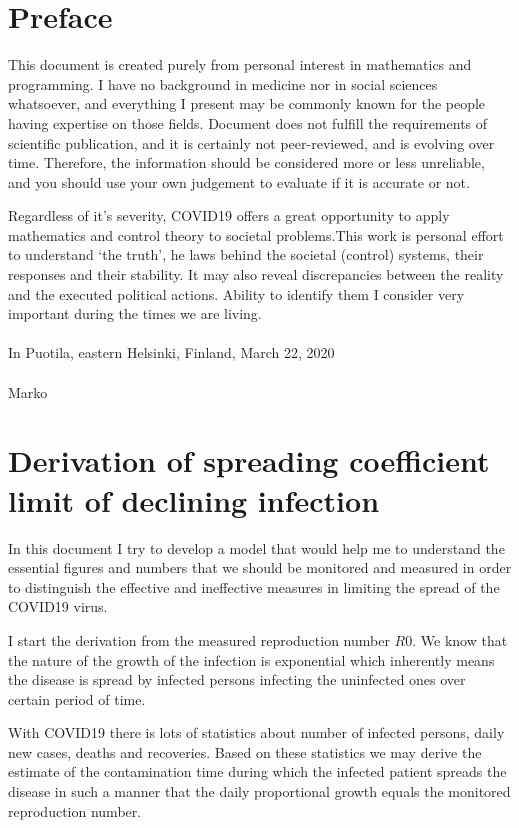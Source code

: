 \chapter{Preface}
This document is created purely from personal interest in mathematics and
programming. I have no background in medicine nor in social sciences
whatsoever, and everything I present may be commonly known for the people
having expertise on those fields. Document does not fulfill the requirements
of scientific publication, and it is certainly not peer-reviewed, and is
evolving over time. Therefore, the information should be considered more or
less unreliable, and you should use your own judgement to evaluate if it is
accurate or not. 

Regardless of it's
severity, COVID19 offers a great opportunity to apply mathematics and control
theory to societal problems.This work is personal effort to understand `the
truth', he laws behind the societal (control) systems, their responses and
their stability.  It may also reveal discrepancies between the reality and the
executed political actions. Ability to identify them I consider very important
during the times we are living.
\\
\\
In Puotila, eastern Helsinki, Finland, March 22, 2020\\
\\
Marko


\chapter{Derivation of spreading coefficient limit of declining infection}\label{chap:principles}

In this document I try to develop a model that would help me to understand the
essential figures and numbers that we should be monitored and measured in order to 
distinguish the effective and ineffective measures in limiting the spread of
the COVID19 virus.

I start the derivation from the measured reproduction number $R0$. We know that
the nature of the growth of the infection is exponential which inherently
means the disease is spread by infected persons infecting the uninfected ones
over certain period of time.

With COVID19 there is lots of statistics about number of
infected persons, daily new cases, deaths and recoveries. Based on these
statistics we may derive the estimate of the contamination time during which
the infected patient spreads the disease in such a manner that the daily
proportional growth equals the monitored reproduction number.

